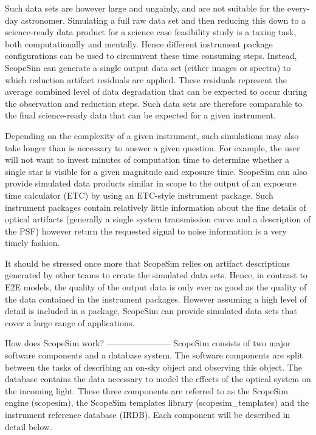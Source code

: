 Such data sets are however large and ungainly, and are not suitable for the
every-day astronomer. Simulating a full raw data set and then reducing this
down to a science-ready data product for a science case feasibility study is
a taxing task, both computationally and mentally. Hence different instrument
package configurations can be used to circumvent these time consuming steps.
Instead, ScopeSim can generate a single output data set (either images or
spectra) to which reduction artifact residuals are applied. These residuals
represent the average combined level of data degradation that can be expected to
occur during the observation and reduction steps. Such data sets are therefore
comparable to the final science-ready data that can be expected for a given
instrument.

Depending on the complexity of a given instrument, such simulations may also
take longer than is necessary to answer a given question. For example, the user
will not want to invest minutes of computation time to determine whether a
single star is visible for a given magnitude and exposure time. ScopeSim can
also provide simulated data products similar in scope to the output of an
exposure time calculator (ETC) by using an ETC-style instrument package.
Such instrument packages contain relatively little information about the
fine details of optical artifacts (generally a single system transmission curve
and a description of the PSF) however return the requested signal to noise
information is a very timely fashion.

It should be stressed once more that ScopeSim relies on artifact descriptions
generated by other teams to create the simulated data sets. Hence, in contrast
to E2E models, the quality of the output data is only ever as good as the
quality of the data contained in the instrument packages. However assuming a
high level of detail is included in a package, ScopeSim can provide
simulated data sets that cover a large range of applications.


How does ScopeSim work?
-----------------------
ScopeSim consists of two major software components and a database system. The
software components are split between the tasks of describing an on-sky object
and observing this object. The database contains the data necessary to model the
effects of the optical system on the incoming light. These three components are
referred to as the ScopeSim engine (scopesim), the ScopeSim templates library
(scopesim_templates) and the instrument reference database (IRDB). Each
component will be described in detail below.


